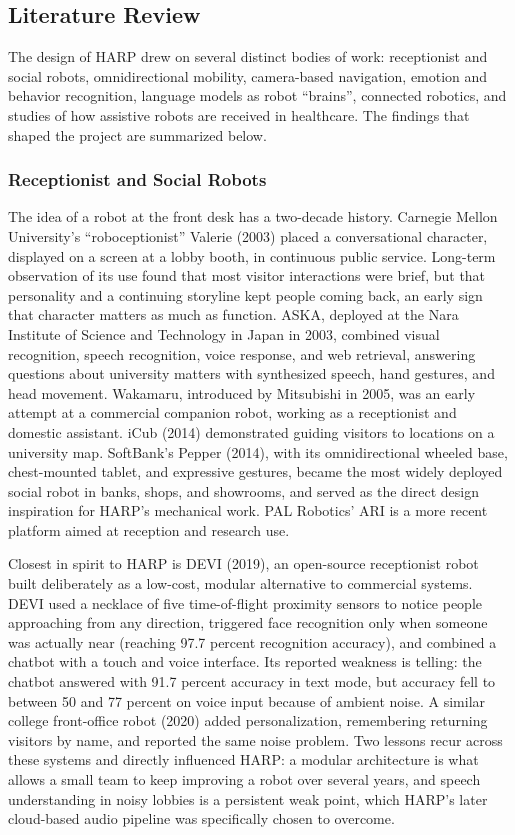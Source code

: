 \documentclass[11pt,a4paper]{article}
\begin{document}
\subsection{Literature Review}

The design of HARP drew on several distinct bodies of work: receptionist and social robots, omnidirectional mobility, camera-based navigation, emotion and behavior recognition, language models as robot ``brains'', connected robotics, and studies of how assistive robots are received in healthcare. The findings that shaped the project are summarized below.

\subsubsection{Receptionist and Social Robots}

The idea of a robot at the front desk has a two-decade history. Carnegie Mellon University's ``roboceptionist'' Valerie (2003) placed a conversational character, displayed on a screen at a lobby booth, in continuous public service. Long-term observation of its use found that most visitor interactions were brief, but that personality and a continuing storyline kept people coming back, an early sign that character matters as much as function. ASKA, deployed at the Nara Institute of Science and Technology in Japan in 2003, combined visual recognition, speech recognition, voice response, and web retrieval, answering questions about university matters with synthesized speech, hand gestures, and head movement. Wakamaru, introduced by Mitsubishi in 2005, was an early attempt at a commercial companion robot, working as a receptionist and domestic assistant. iCub (2014) demonstrated guiding visitors to locations on a university map. SoftBank's Pepper (2014), with its omnidirectional wheeled base, chest-mounted tablet, and expressive gestures, became the most widely deployed social robot in banks, shops, and showrooms, and served as the direct design inspiration for HARP's mechanical work. PAL Robotics' ARI is a more recent platform aimed at reception and research use.

Closest in spirit to HARP is DEVI (2019), an open-source receptionist robot built deliberately as a low-cost, modular alternative to commercial systems. DEVI used a necklace of five time-of-flight proximity sensors to notice people approaching from any direction, triggered face recognition only when someone was actually near (reaching 97.7 percent recognition accuracy), and combined a chatbot with a touch and voice interface. Its reported weakness is telling: the chatbot answered with 91.7 percent accuracy in text mode, but accuracy fell to between 50 and 77 percent on voice input because of ambient noise. A similar college front-office robot (2020) added personalization, remembering returning visitors by name, and reported the same noise problem. Two lessons recur across these systems and directly influenced HARP: a modular architecture is what allows a small team to keep improving a robot over several years, and speech understanding in noisy lobbies is a persistent weak point, which HARP's later cloud-based audio pipeline was specifically chosen to overcome.
\end{document}
